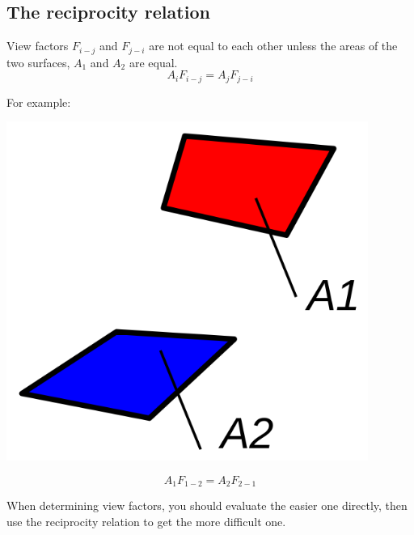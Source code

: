 \documentclass[11pt]{article}
\begin{document}
\subsection{The reciprocity relation}
\label{sec:orgc4fdd90}
View factors \(F_{i-j}\) and \(F_{j-i}\) are not equal to each other unless the areas of the two surfaces, \(A_1\) and \(A_2\) are equal.
\[A_i F_{i-j} = A_j F_{j-i}\]

For example:
\begin{center}
\includegraphics[width=.9\linewidth]{./images/view-factor-surfaces-a1-and-a2-diagram.png}
\end{center}
\[A_1 F_{1-2} = A_2 F_{2-1}\]

When determining view factors, you should evaluate the easier one directly, then use the reciprocity relation to get the more difficult one.

 \newpage
\end{document}
